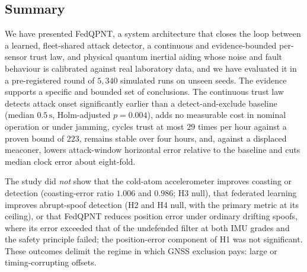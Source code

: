 \documentclass[12pt,a4paper]{article}
\begin{document}
\subsection{Summary}
We have presented FedQPNT, a system architecture that closes the loop between a learned, fleet-shared attack detector, a continuous and evidence-bounded per-sensor trust law, and physical quantum inertial aiding whose noise and fault behaviour is calibrated against real laboratory data, and we have evaluated it in a pre-registered round of $5{,}340$ simulated runs on unseen seeds. The evidence supports a specific and bounded set of conclusions. The continuous trust law detects attack onset significantly earlier than a detect-and-exclude baseline (median $0.5\,\mathrm{s}$, Holm-adjusted $p=0.004$), adds no measurable cost in nominal operation or under jamming, cycles trust at most $29$ times per hour against a proven bound of $223$, remains stable over four hours, and, against a displaced meaconer, lowers attack-window horizontal error relative to the baseline and cuts median clock error about eight-fold.

The study did \emph{not} show that the cold-atom accelerometer improves coasting or detection (coasting-error ratio $1.006$ and $0.986$; H3 null), that federated learning improves abrupt-spoof detection (H2 and H4 null, with the primary metric at its ceiling), or that FedQPNT reduces position error under ordinary drifting spoofs, where its error exceeded that of the undefended filter at both IMU grades and the safety principle failed; the position-error component of H1 was not significant. These outcomes delimit the regime in which GNSS exclusion pays: large or timing-corrupting offsets.
\end{document}
